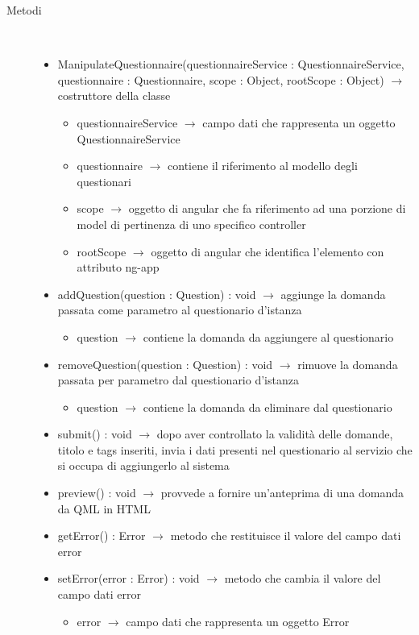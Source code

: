 \begin{description}
\item[Metodi] \hfill \\
\vspace{-7mm}
\begin{itemize}
	\item ManipulateQuestionnaire(questionnaireService : QuestionnaireService, questionnaire : Questionnaire, scope : Object, rootScope : Object) $\rightarrow$ costruttore della classe\begin{itemize}
		\item questionnaireService $\rightarrow$ campo dati che rappresenta un oggetto QuestionnaireService
		\item questionnaire $\rightarrow$ contiene il riferimento al modello degli questionari 
		\item scope $\rightarrow$ oggetto di angular che fa riferimento ad una porzione di model di pertinenza di uno specifico controller
		\item rootScope $\rightarrow$ oggetto di angular che identifica l’elemento con attributo ng-app
	\end{itemize}
	
	\item addQuestion(question : Question) : void $\rightarrow$ aggiunge la domanda passata come parametro al questionario d'istanza\begin{itemize}
		\item question $\rightarrow$ contiene la domanda da aggiungere al questionario 
	\end{itemize}
	
	\item removeQuestion(question : Question) : void $\rightarrow$ rimuove la domanda passata per parametro dal questionario d'istanza\begin{itemize}
		\item question $\rightarrow$ contiene la domanda da eliminare dal questionario 
	\end{itemize}
	
	\item submit() : void $\rightarrow$ dopo aver controllato la validità delle domande, titolo e tags inseriti, invia i dati presenti nel questionario al servizio che si occupa di aggiungerlo al sistema
	\item preview() : void $\rightarrow$ provvede a fornire un'anteprima di una domanda da QML in HTML
	\item getError() : Error $\rightarrow$ metodo che restituisce il valore del campo dati error
	\item setError(error : Error) : void $\rightarrow$ metodo che cambia il valore del campo dati error\begin{itemize}
		\item error $\rightarrow$ campo dati che rappresenta un oggetto Error
	\end{itemize}
	

\end{itemize}
\end{description}
